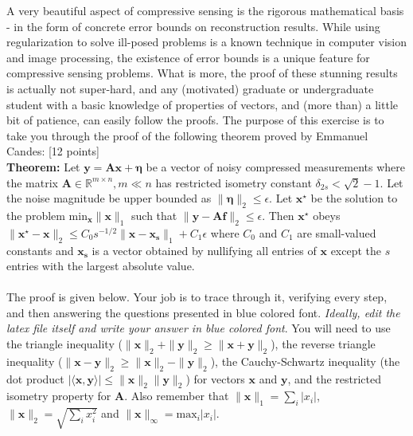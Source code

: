 \documentclass[11pt]{article}
\begin{document}
\maketitle


A very beautiful aspect of compressive sensing is the rigorous mathematical basis - in the form of concrete error bounds on reconstruction results. While using regularization to solve ill-posed problems is a known technique in computer vision and image processing, the existence of error bounds is a unique feature for compressive sensing problems. What is more, the proof of these stunning results is actually not super-hard, and any (motivated) graduate or undergraduate student with a basic knowledge of properties of vectors, and (more than) a little bit of patience, can easily follow the proofs. The purpose of this exercise is to take you through the proof of the following theorem proved by Emmanuel Candes: \textsf{[12 points]}
\\
\textbf{Theorem:} Let $\mathbf{y} = \mathbf{Ax}+\mathbf{\eta}$ be a vector of noisy compressed measurements where the matrix $\mathbf{A} \in \mathbb{R}^{m \times n},  m \ll n$ has restricted isometry constant $\delta_{2s} < \sqrt{2}-1$. Let the noise magnitude be upper bounded as $\|\mathbf{\eta}\|_2 \leq \epsilon$. Let $\mathbf{x}^{\star}$ be the solution to the problem $\textrm{min}_{\mathbf{x}} \|\mathbf{x}\|_1$ such that $\|\mathbf{y} - \mathbf{Af}\|_2 \leq \epsilon$. Then $\mathbf{x^{\star}}$ obeys 
$\|\mathbf{x^{\star} - x}\|_2 \leq C_0 s^{-1/2}\|\mathbf{x - x_s}\|_1  + C_1 \epsilon$ where $C_0$ and $C_1$ are small-valued constants and $\mathbf{x_s}$ is a vector obtained by nullifying all entries of $\mathbf{x}$ except the $s$ entries with the largest absolute value. 
\\
\\
The proof is given below. Your job is to trace through it, verifying every step, and then answering the questions presented in blue colored font. \emph{Ideally, edit the latex file itself and write your answer in blue colored font}.
You will need to use the triangle inequality ($\|\mathbf{x}\|_2 + \|\mathbf{y}\|_2 \geq \|\mathbf{x}+\mathbf{y}\|_2$), the reverse triangle inequality ($\|\mathbf{x}-\mathbf{y}\|_2 \geq \|\mathbf{x}\|_2 - \|\mathbf{y}\|_2$), the Cauchy-Schwartz inequality (the dot product $|\langle \mathbf{x}, \mathbf{y} \rangle| \leq \|\mathbf{x}\|_2 \|\mathbf{y}\|_2$) for vectors $\mathbf{x}$ and $\mathbf{y}$, and the restricted isometry property for $\mathbf{A}$. Also remember that $\|\mathbf{x}\|_1 = \sum_i |x_i|$, $\|\mathbf{x}\|_2 = \sqrt{\sum_i x^2_i}$ and $\|\mathbf{x}\|_{\infty} = \textrm{max}_i |x_i|$.
\end{document}
